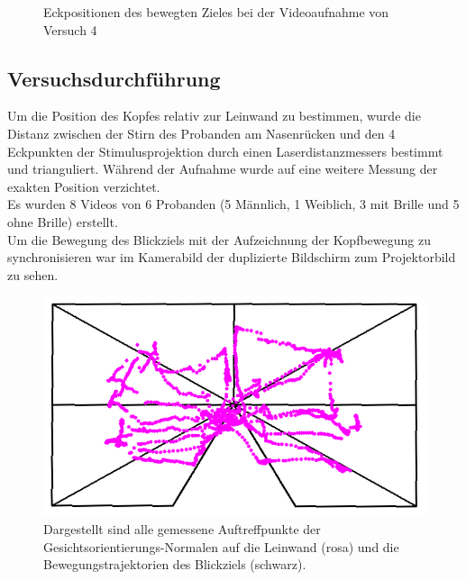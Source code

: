 \begin{figure}
\centering
{}
\caption{Eckpositionen des bewegten Zieles bei der Videoaufnahme von Versuch 4}
\label{img_targets}
\end{figure}
\subsection{Versuchsdurchführung}
Um die Position des Kopfes relativ zur Leinwand zu bestimmen, wurde die Distanz zwischen der Stirn des Probanden am Nasenrücken und den 4 Eckpunkten der Stimulusprojektion durch einen Laserdistanzmessers bestimmt und trianguliert. Während der Aufnahme wurde auf eine weitere Messung der exakten Position verzichtet.\\
Es wurden 8 Videos von 6 Probanden (5 Männlich, 1 Weiblich, 3 mit Brille und 5 ohne Brille) erstellt.\\
Um die Bewegung des Blickziels mit der Aufzeichnung der Kopfbewegung zu synchronisieren war im Kamerabild der duplizierte Bildschirm zum Projektorbild zu sehen.
\begin{figure}
	\centering
	\includegraphics[width=\linewidth]{OpenFace_Img/VideoSumme}
	\caption{Dargestellt sind alle gemessene Auftreffpunkte der Gesichtsorientierungs-Normalen auf die Leinwand (rosa) und die Bewegungstrajektorien des Blickziels (schwarz).}
	\label{img_videosumme}
\end{figure}

